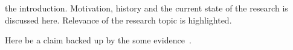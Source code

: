  the introduction. Motivation, history and the current state of the research is discussed here. Relevance of the research topic is highlighted.

Here be a claim backed up by the some evidence~\cite{Allman99}.
